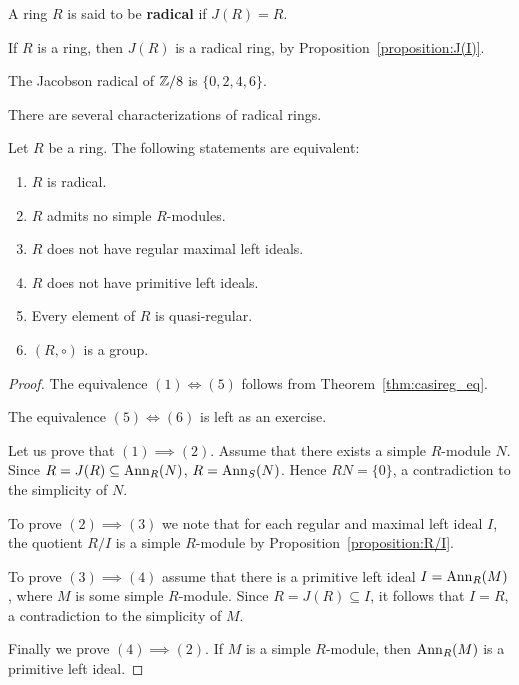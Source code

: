 \begin{definition}
A ring $R$ is said to be \textbf{radical} if $J(R)=R$. 
\end{definition}

\begin{example}
	If $R$ is a ring, then $J(R)$ is a radical ring, by Proposition~\ref{proposition:J(I)}.
\end{example}

\begin{example}
	The Jacobson radical of $\mathbb{Z}/8$ is $\{0,2,4,6\}$. 
\end{example}

There are several characterizations of radical rings. 

\begin{theorem}
	\label{theorem:anillo_radical}
	Let $R$ be a ring. The following statements are equivalent: 
	\begin{enumerate}
		\item $R$ is radical.
		\item $R$ admits no simple $R$-modules. 
		\item $R$ does not have regular maximal left ideals.
		\item $R$ does not have primitive left ideals.
		\item Every element of $R$ is quasi-regular. 
		\item $(R,\circ)$ is a group. 
	\end{enumerate}
\end{theorem}

\begin{proof}
	The equivalence $(1)\Longleftrightarrow(5)$ follows from 
	Theorem~\ref{thm:casireg_eq}. 
    
    The equivalence $(5)\Longleftrightarrow(6)$ is left as an exercise. 

	Let us prove that $(1)\implies(2)$. Assume that there exists a simple $R$-module $N$. Since 
	$R=J(R)\subseteq\operatorname{Ann}_R(N)$, $R=\operatorname{Ann}_S(N)$. 
	Hence $RN=\{0\}$, a contradiction to the simplicity of $N$.
	
	To prove $(2)\implies(3)$ we note that for each regular and maximal left ideal 
	$I$, the quotient $R/I$ is a simple $R$-module by
	Proposition~\ref{proposition:R/I}. 
	
	To prove $(3)\implies(4)$ assume that there is a primitive left ideal 
	$I=\operatorname{Ann}_R(M)$, where $M$ is some simple $R$-module. Since $R=J(R)\subseteq I$, it follows that  
    $I=R$, a contradiction to the simplicity of $M$.

	Finally we prove $(4)\implies(2)$. If $M$ is a simple $R$-module, then 
	$\operatorname{Ann}_R(M)$ is a primitive left ideal.
\end{proof}

